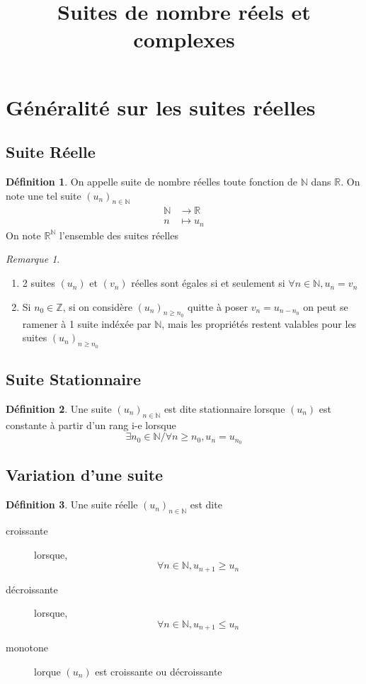 \documentclass{article}
\title{Suites de nombre réels et complexes}
\newcommand{\ssi}{si et seulement si}
\newcommand{\R}{\mathbb{R}}
\newcommand{\N}{\mathbb{N}}
\newcommand{\Z}{\mathbb{Z}}
\newcommand{\resu}{(u_n)_{n \in \N}}
\newcommand{\allent}{\forall n \in \N}
\theoremstyle{definition}
\newtheorem*{dfn}{Définition}
\theoremstyle{remark}
\newtheorem*{rem}{Remarque}
\theoremstyle{plain}
\begin{document}
\maketitle
\pagebreak

\section{Généralité sur les suites réelles}
\subsection{Suite Réelle}
\begin{dfn}
On appelle suite de nombre réelles toute fonction de $\N$ dans
$\R$. On note une tel suite $\resu$
\begin{align*}
    \N &\to \R\\
    n &\mapsto u_n
\end{align*}
On note $\R^{\N}$ l'ensemble des suites réelles
\end{dfn}

\begin{rem} 
\quad
\begin{enumerate}
    \item 2 suites $(u_n)$ et $(v_n)$ réelles sont égales \ssi 
    \space $\forall n \in \N, u_n = v_n$
    \item Si $n_0 \in \Z$, si on considère $(u_n)_{n \geq n_0}$
    quitte à poser $v_n = u_{n - n_0}$ on peut se ramener à 1
    suite indéxée par $\N$, mais les propriétés restent valables
    pour les suites $(u_n)_{n \geq n_0}$
\end{enumerate}
\end{rem}

\subsection{Suite Stationnaire}
\begin{dfn}
Une suite $\resu$ est dite stationnaire lorsque $(u_n)$ est
constante à partir d'un rang i-e lorsque
\[
    \exists n_0 \in \N / \forall n \geq n_0, u_n = u_{n_0}
\]
\end{dfn}

\subsection{Variation d'une suite}
\begin{dfn}
Une suite réelle $\resu$ est dite
\begin{description}
    \item[croissante] lorsque,
    \[
        \allent, u_{n + 1} \geq u_n
    \]
    \item[décroissante] lorsque,
    \[
        \allent, u_{n + 1} \leq u_n
    \]
    \item[monotone] lorque $(u_n)$ est croissante ou décroissante
\end{description}
\end{dfn}
\end{document}
